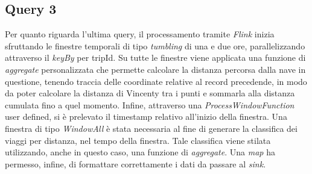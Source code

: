 \documentclass[conference]{IEEEtran}
\begin{document}
\subsection*{\textbf{Query 3}}
Per quanto riguarda l'ultima query, il processamento tramite \emph{Flink} inizia sfruttando le
finestre temporali di tipo \emph{tumbling}
di una e due ore, parallelizzando attraverso il \emph{keyBy} per tripId. Su tutte le finestre viene applicata una funzione di \emph{aggregate} personalizzata che permette calcolare la distanza percorsa dalla nave in questione, tenendo traccia delle coordinate relative al record precedende, in modo da poter calcolare la distanza di Vincenty tra i punti e sommarla alla distanza cumulata fino a quel momento. Infine, attraverso una \emph{ProcessWindowFunction} user defined, si \`{e} prelevato il timestamp relativo all'inizio della finestra. Una finestra di tipo \emph{WindowAll} \`{e} stata necessaria al fine di generare la classifica dei viaggi per distanza, nel tempo della finestra. Tale classifica viene stilata utilizzando, anche in questo caso, una funzione di \emph{aggregate}. Una \emph{map} ha permesso, infine, di formattare correttamente i dati da passare al \emph{sink}.
\end{document}
